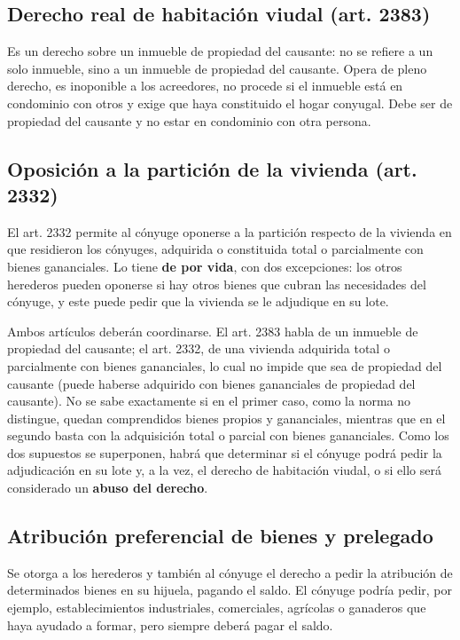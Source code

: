 \documentclass[12pt,oneside]{book}
\begin{document}
\subsection{Derecho real de habitación viudal (art. 2383)}

Es un derecho sobre un inmueble de propiedad del causante: no se refiere a un solo inmueble, sino a un inmueble de propiedad del causante. Opera de pleno derecho, es inoponible a los acreedores, no procede si el inmueble está en condominio con otros y exige que haya constituido el hogar conyugal. Debe ser de propiedad del causante y no estar en condominio con otra persona.

\subsection{Oposición a la partición de la vivienda (art. 2332)}

El art. 2332 permite al cónyuge oponerse a la partición respecto de la vivienda en que residieron los cónyuges, adquirida o constituida total o parcialmente con bienes gananciales. Lo tiene \textbf{de por vida}, con dos excepciones: los otros herederos pueden oponerse si hay otros bienes que cubran las necesidades del cónyuge, y este puede pedir que la vivienda se le adjudique en su lote.

Ambos artículos deberán coordinarse. El art. 2383 habla de un inmueble de propiedad del causante; el art. 2332, de una vivienda adquirida total o parcialmente con bienes gananciales, lo cual no impide que sea de propiedad del causante (puede haberse adquirido con bienes gananciales de propiedad del causante). No se sabe exactamente si en el primer caso, como la norma no distingue, quedan comprendidos bienes propios y gananciales, mientras que en el segundo basta con la adquisición total o parcial con bienes gananciales. Como los dos supuestos se superponen, habrá que determinar si el cónyuge podrá pedir la adjudicación en su lote y, a la vez, el derecho de habitación viudal, o si ello será considerado un \textbf{abuso del derecho}.

\subsection{Atribución preferencial de bienes y prelegado}

Se otorga a los herederos y también al cónyuge el derecho a pedir la atribución de determinados bienes en su hijuela, pagando el saldo. El cónyuge podría pedir, por ejemplo, establecimientos industriales, comerciales, agrícolas o ganaderos que haya ayudado a formar, pero siempre deberá pagar el saldo.
\end{document}
